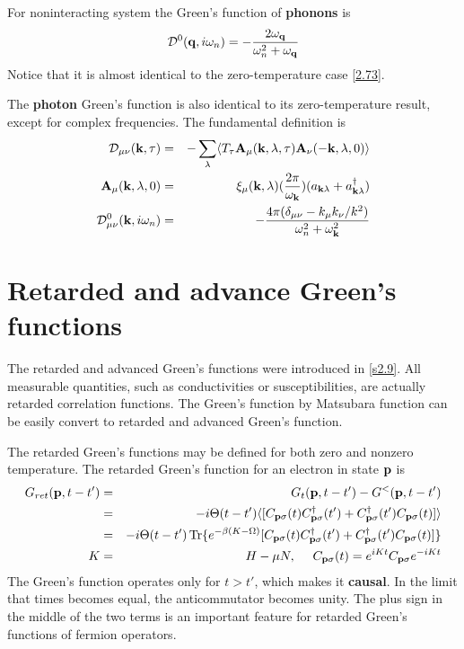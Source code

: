 For noninteracting system the Green's function of \textbf{phonons} is
\begin{equation}
  \mathcal{D}^0(\mathbf{q},i\omega_n) = -\frac{2\omega_{\mathbf{q}}}{\omega_n^2 + \omega_{\mathbf{q}}} \label{3.76}
\end{equation}
Notice that it is almost identical to the zero-temperature case \eqref{2.73}.

The \textbf{photon} Green's function is also identical to its zero-temperature result, except for complex frequencies.
The  fundamental definition is
\begin{eqnarray}
  \mathcal{D}_{\mu\nu}(\mathbf{k},\tau) &=& -\sum_\lambda \langle T_\tau \mathbf{A}_\mu(\mathbf{k},\lambda,\tau) \mathbf{A}_\nu(-\mathbf{k},\lambda,0)\rangle \label{3.77}\\
  \mathbf{A}_\mu(\mathbf{k},\lambda,0) &=& \xi_\mu(\mathbf{k},\lambda) (\frac{2\pi}{\omega_{\mathbf{k}}})(a_{\mathbf{k} \lambda}+ a^\dagger_{\mathbf{k} \lambda}) \label{3.78}\\
  \mathcal{D}^0_{\mu\nu}(\mathbf{k},i\omega_n)&=&-\frac{4\pi(\delta_{\mu\nu}-k_\mu k_\nu/k^2)}{\omega_n^2+\omega_{\mathbf{k}}^2} \label{3.79}
\end{eqnarray}

\section{Retarded and advance Green's functions}\label{s3.3}
The retarded and advanced Green's functions were introduced in \ref{s2.9}.
All measurable quantities, such as conductivities or susceptibilities, are actually retarded correlation functions.
The Green's function by Matsubara function can be easily convert to retarded and advanced Green's function.

The retarded Green's functions may be defined for both zero and nonzero temperature.
The retarded Green's function for an electron in state $\mathbf{p}$ is
\begin{eqnarray}
  G_{ret}(\mathbf{p},t-t') &=& G_t(\mathbf{p},t-t') - G^<(\mathbf{p},t-t')  \\
  &=&-i\Theta(t-t')\langle [C_{\mathbf{p}\sigma}(t)C^\dagger_{\mathbf{p}\sigma}(t') + C^\dagger_{\mathbf{p}\sigma}(t')C_{\mathbf{p}\sigma}(t)] \rangle \nonumber \\
  &=&-i\Theta(t-t')\Tr \{ e^{-\beta (K-\Omega)} [C_{\mathbf{p}\sigma}(t) C^\dagger_{\mathbf{p}\sigma}(t') + C^\dagger_{\mathbf{p}\sigma}(t')C_{\mathbf{p}\sigma}(t)]\} \nonumber \label{3.82} \\
  K&=&H-\mu N, ~ ~ ~ ~ C_{\mathbf{p}\sigma}(t) = e^{iKt}C_{\mathbf{p}\sigma}e^{-iKt} \label{3.83}
\end{eqnarray}
The Green's function operates only for $t>t'$, which makes it \textbf{causal}.
In the limit that times becomes equal, the anticommutator becomes unity.
The plus sign in the middle of the two terms is an important feature for retarded Green's functions of fermion operators.

